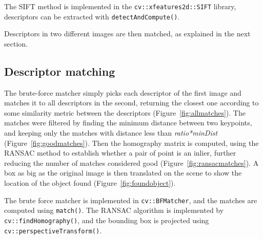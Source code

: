 \documentclass[a4paper]{article}
\newcommand{\rfig}[1]{Figure~\ref{#1}}
\begin{document}
The SIFT method is implemented in the \texttt{cv::xfeatures2d::SIFT} library, descriptors can be extracted with \texttt{detectAndCompute()}.

Descriptors in two different images are then matched, as explained in the next section.

\subsection{Descriptor matching}
\label{sss:matching}
The brute-force matcher simply picks each descriptor of the first image and matches it to all descriptors in the second, returning the closest one according to some similarity metric between the descriptors (\rfig{fig:allmatches}).
The matches were filtered by finding the minimum distance between two keypoints, and keeping only the matches with distance less than \emph{ratio*minDist} (\rfig{fig:goodmatches}).
Then the homography matrix is computed, using the RANSAC method to establish whether a pair of point is an inlier, further reducing the number of matches considered good (\rfig{fig:ransacmatches}).
A box as big as the original image is then translated on the scene to show the location of the object found (\rfig{fig:foundobject}).

The brute force matcher is implemented in \texttt{cv::BFMatcher}, and the matches are computed using \texttt{match()}. The RANSAC algorithm is implemented by \texttt{cv::findHomography()}, and the bounding box is projected using \texttt{cv::perspectiveTransform()}.
\end{document}
